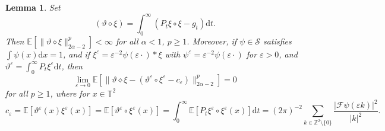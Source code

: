 \documentclass[11pt,a4paper]{article}
\newcommand{\mathd}{\mathrm{d}}
\newtheorem{lemma}[theorem]{Lemma}
\theoremstyle{remark}
\newcommand{\Z}{\mathbb{Z}}
\newcommand{\E}{\mathbb{E}}
\newcommand{\CF}{\ensuremath{\mathscr{F}}}
\newcommand{\CS}{\ensuremath{\mathscr{S}}}
\begin{document}
\begin{lemma}\label{l:pam area}
   Set
   \[
      (\vartheta \diamond \xi) = \int_0^\infty (P_t \xi \circ \xi - g_t) \mathd t.
   \]
   Then $\E [\| \vartheta \diamond \xi\|_{2\alpha - 2}^p]<\infty$ for all $\alpha < 1$, $p \geqslant 1$. Moreover, if $\psi \in \CS$ satisfies $\int \psi(x) \mathd x = 1$, and if $\xi^\varepsilon = \varepsilon^{-2} \psi(\varepsilon \cdot) \ast \xi$ with $\psi^\varepsilon = \varepsilon^{-2} \psi(\varepsilon \cdot)$ for $\varepsilon > 0$, and $\vartheta^\varepsilon = \int_0^\infty P_t \xi^\varepsilon \mathd t$, then
   \[
      \lim_{\varepsilon \rightarrow 0} \E[ \| \vartheta \diamond \xi - ( \vartheta^\varepsilon \circ \xi^\varepsilon - c_\varepsilon) \|_{2\alpha - 2}^p] = 0
   \]
   for all $p \geqslant 1$, where for $x \in \mathbb{T}^2$
   \[
      c_\varepsilon = \E[\vartheta^\varepsilon(x) \xi^\varepsilon(x)] = \E[\vartheta^\varepsilon \circ \xi^\varepsilon(x)] = \int_0^\infty \E[P_t \xi^\varepsilon \circ \xi^\varepsilon(x)] \mathd t =  (2\pi)^{-2} \sum_{k \in \Z^2 \setminus\{0\}} \frac{|\CF \psi(\varepsilon k)|^2}{|k|^2}.
   \]
\end{lemma}
\end{document}
